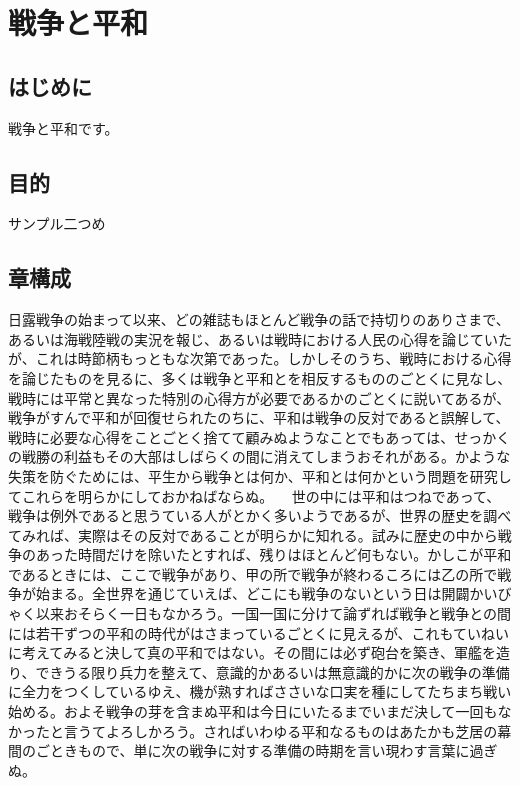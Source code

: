 \chapter{戦争と平和}

\section{はじめに}
戦争と平和です。
\section{目的}
サンプル二つめ
\section{章構成}

日露戦争の始まって以来、どの雑誌もほとんど戦争の話で持切りのありさまで、あるいは海戦陸戦の実況を報じ、あるいは戦時における人民の心得を論じていたが、これは時節柄もっともな次第であった。しかしそのうち、戦時における心得を論じたものを見るに、多くは戦争と平和とを相反するもののごとくに見なし、戦時には平常と異なった特別の心得方が必要であるかのごとくに説いてあるが、戦争がすんで平和が回復せられたのちに、平和は戦争の反対であると誤解して、戦時に必要な心得をことごとく捨てて顧みぬようなことでもあっては、せっかくの戦勝の利益もその大部はしばらくの間に消えてしまうおそれがある。かような失策を防ぐためには、平生から戦争とは何か、平和とは何かという問題を研究してこれらを明らかにしておかねばならぬ。
　世の中には平和はつねであって、戦争は例外であると思うている人がとかく多いようであるが、世界の歴史を調べてみれば、実際はその反対であることが明らかに知れる。試みに歴史の中から戦争のあった時間だけを除いたとすれば、残りはほとんど何もない。かしこが平和であるときには、ここで戦争があり、甲の所で戦争が終わるころには乙の所で戦争が始まる。全世界を通じていえば、どこにも戦争のないという日は開闢かいびゃく以来おそらく一日もなかろう。一国一国に分けて論ずれば戦争と戦争との間には若干ずつの平和の時代がはさまっているごとくに見えるが、これもていねいに考えてみると決して真の平和ではない。その間には必ず砲台を築き、軍艦を造り、できうる限り兵力を整えて、意識的かあるいは無意識的かに次の戦争の準備に全力をつくしているゆえ、機が熟すればささいな口実を種にしてたちまち戦い始める。およそ戦争の芽を含まぬ平和は今日にいたるまでいまだ決して一回もなかったと言うてよろしかろう。さればいわゆる平和なるものはあたかも芝居の幕間のごときもので、単に次の戦争に対する準備の時期を言い現わす言葉に過ぎぬ。
